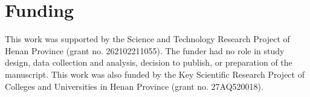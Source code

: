 \documentclass[preprint,12pt]{elsarticle}
\begin{document}
\section*{Funding}
This work was supported by the Science and Technology Research Project of
Henan Province (grant no. 262102211055). The funder had no role in study design,
data collection and analysis, decision to publish, or preparation of the
manuscript. This work was also funded by the Key Scientific Research Project
of Colleges and Universities in Henan Province (grant no. 27AQ520018).

\end{document}
